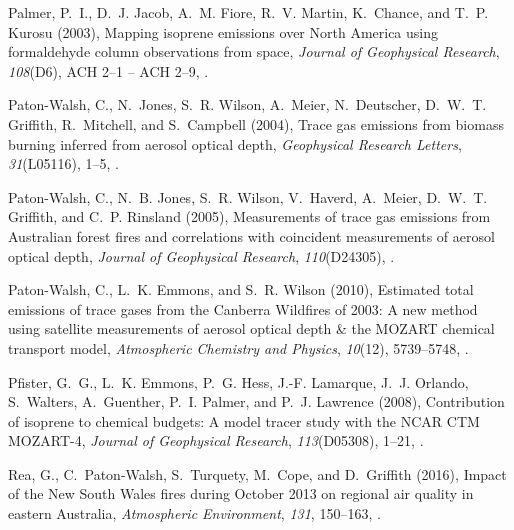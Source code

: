 \documentclass[draft,linenumbers]{AGUJournal}
\begin{document}
\begin{thebibliography}{51}
Palmer, P.~I., D.~J. Jacob, A.~M. Fiore, R.~V. Martin, K.~Chance, and T.~P.
  Kurosu (2003), {Mapping isoprene emissions over North America using
  formaldehyde column observations from space}, \textit{Journal of Geophysical
  Research}, \textit{108}(D6), ACH 2--1 -- ACH 2--9,
  .

Paton-Walsh, C., N.~Jones, S.~R. Wilson, A.~Meier, N.~Deutscher, D.~W.~T.
  Griffith, R.~Mitchell, and S.~Campbell (2004), {Trace gas emissions from
  biomass burning inferred from aerosol optical depth}, \textit{Geophysical
  Research Letters}, \textit{31}(L05116), 1--5, .

Paton-Walsh, C., N.~B. Jones, S.~R. Wilson, V.~Haverd, A.~Meier, D.~W.~T.
  Griffith, and C.~P. Rinsland (2005), {Measurements of trace gas emissions
  from Australian forest fires and correlations with coincident measurements of
  aerosol optical depth}, \textit{Journal of Geophysical Research},
  \textit{110}(D24305), .

Paton-Walsh, C., L.~K. Emmons, and S.~R. Wilson (2010), {Estimated total
  emissions of trace gases from the Canberra Wildfires of 2003: A new method
  using satellite measurements of aerosol optical depth {\&} the MOZART
  chemical transport model}, \textit{Atmospheric Chemistry and Physics},
  \textit{10}(12), 5739--5748, .

Pfister, G.~G., L.~K. Emmons, P.~G. Hess, J.-F. Lamarque, J.~J. Orlando,
  S.~Walters, A.~Guenther, P.~I. Palmer, and P.~J. Lawrence (2008),
  {Contribution of isoprene to chemical budgets: A model tracer study with the
  NCAR CTM MOZART-4}, \textit{Journal of Geophysical Research},
  \textit{113}(D05308), 1--21, .

Rea, G., C.~Paton-Walsh, S.~Turquety, M.~Cope, and D.~Griffith (2016), {Impact
  of the New South Wales fires during October 2013 on regional air quality in
  eastern Australia}, \textit{Atmospheric Environment}, \textit{131}, 150--163,
  .


\end{thebibliography}
\end{document}
